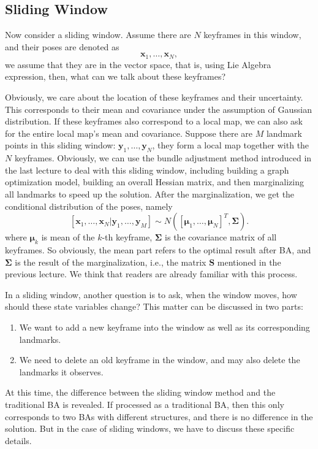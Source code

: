 \subsection{Sliding Window}
Now consider a sliding window. Assume there are $N$ keyframes in this window, and their poses are denoted as $$\bm{x}_1, \ldots, \bm{x}_N,$$ we assume that they are in the vector space, that is, using Lie Algebra expression, then, what can we talk about these keyframes?

Obviously, we care about the location of these keyframes and their uncertainty. This corresponds to their mean and covariance under the assumption of Gaussian distribution. If these keyframes also correspond to a local map, we can also ask for the entire local map's mean and covariance. Suppose there are $M$ landmark points in this sliding window: $\bm{y}_1, \ldots, \bm{y}_N$, they form a local map together with the $N$ keyframes. Obviously, we can use the bundle adjustment method introduced in the last lecture to deal with this sliding window, including building a graph optimization model, building an overall Hessian matrix, and then marginalizing all landmarks to speed up the solution. After the marginalization, we get the conditional distribution of the poses, namely $$[\bm{x}_1, \ldots, \bm{x}_N | \bm{y}_1, \ldots, \bm{y}_M ] \sim N([\boldsymbol{\mu }_1, \ldots, \boldsymbol{\mu}_N]^T, \boldsymbol{\Sigma}).$$ where $\boldsymbol{\mu}_k$ is mean of the $k$-th keyframe, $\boldsymbol{\Sigma}$ is the covariance matrix of all keyframes. So obviously, the mean part refers to the optimal result after BA, and $\boldsymbol{\Sigma}$ is the result of the marginalization, i.e., the matrix $\bm{S}$ mentioned in the previous lecture. We think that readers are already familiar with this process.

In a sliding window, another question is to ask, when the window moves, how should these state variables change? This matter can be discussed in two parts:

\begin{enumerate}
	\item We want to add a new keyframe into the window as well as its corresponding landmarks.
	\item We need to delete an old keyframe in the window, and may also delete the landmarks it observes.
\end{enumerate}

At this time, the difference between the sliding window method and the traditional BA is revealed. If processed as a traditional BA, then this only corresponds to two BAs with different structures, and there is no difference in the solution. But in the case of sliding windows, we have to discuss these specific details.

